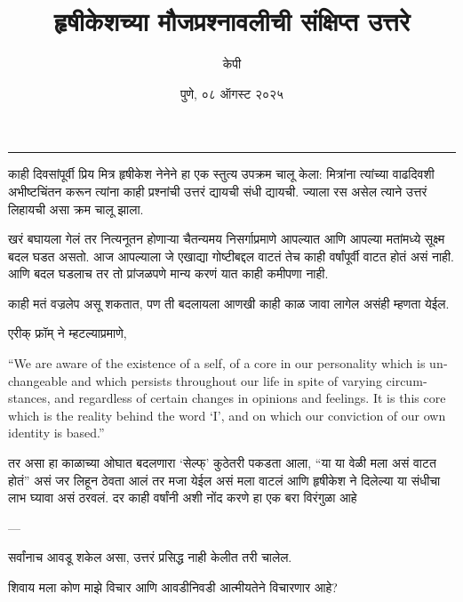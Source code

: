 \documentclass[17pt]{extarticle}  %
\newcommand{\attrib}[1]{%
\nopagebreak{\raggedleft\footnotesize #1\par}}
\begin{document}
\title{हृषीकेशच्या मौजप्रश्नावलीची संक्षिप्त उत्तरे}
\author{केपी}
\date{पुणे, ०८ ऑगस्ट २०२५}
\maketitle
\vspace{5mm}
\hrule

\lettrine[lines=3]{का}{ही} दिवसांपूर्वी प्रिय मित्र हृषीकेश नेनेने हा एक स्तुत्य उपक्रम चालू केला: मित्रांना त्यांच्या वाढदिवशी अभीष्टचिंतन करून त्यांना काही प्रश्नांची उत्तरं द्यायची संधी द्यायची. ज्याला रस असेल त्याने उत्तरं लिहायची असा क्रम चालू झाला. 

खरं बघायला गेलं तर नित्यनूतन होणाऱ्या चैतन्यमय निसर्गाप्रमाणे आपल्यात आणि आपल्या मतांमध्ये सूक्ष्म बदल घडत असतो. आज आपल्याला जे एखाद्या गोष्टीबद्दल वाटतं तेच काही वर्षांपूर्वी वाटत होतं असं नाही. आणि बदल घडलाच तर तो प्रांजळपणे मान्य करणं  यात काही कमीपणा नाही.

काही मतं वज्रलेप असू शकतात, पण ती बदलायला आणखी काही काळ जावा लागेल असंही म्हणता येईल. 

एरीक् फ्रॉम् ने म्हटल्याप्रमाणे, 

\begin{english}
\begin{displayquote}

\enquote{We are aware of the existence of a self, of a core in our personality which is unchangeable and which persists throughout our life in spite of varying circumstances, and regardless of certain changes in opinions and feelings. It is this core which is the reality behind the word `I', and on which our conviction of our own identity is based.}
\end{displayquote}
\attrib{\textit{Eric Fromm}, The Art of Loving}
\end{english}


तर असा हा काळाच्या ओघात बदलणारा \enquote*{सेल्फ्} कुठेतरी पकडता आला, \enquote{या या वेळी मला असं वाटत होतं} असं जर लिहून ठेवता आलं तर मजा येईल असं मला वाटलं आणि हृषीकेश ने दिलेल्या या संधीचा लाभ घ्यावा असं ठरवलं. दर काही वर्षांनी अशी नोंद करणे हा एक बरा विरंगुळा आहे\begin{english}---\end{english}सर्वांनाच आवडू शकेल असा, उत्तरं प्रसिद्ध नाही केलीत तरी चालेल. 

शिवाय मला कोण माझे विचार आणि आवडीनिवडी आत्मीयतेने विचारणार आहे?
\end{document}
